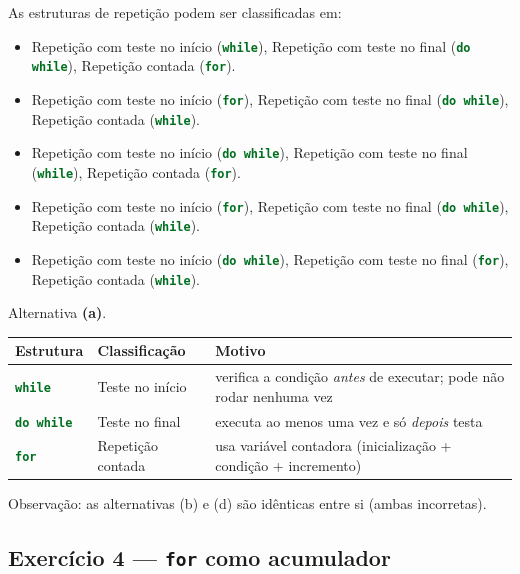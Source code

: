 \documentclass[12pt,a4paper]{article}
\newcommand{\codigo}[1]{\lstinline[language=Java,basicstyle=\ttfamily\small]|#1|}
\begin{document}
\begin{exercicio}
As estruturas de repetição podem ser classificadas em:

\begin{itemize}
  \item[(a)] Repetição com teste no início (\codigo{while}), Repetição com teste
        no final (\codigo{do while}), Repetição contada (\codigo{for}).
  \item[(b)] Repetição com teste no início (\codigo{for}), Repetição com teste
        no final (\codigo{do while}), Repetição contada (\codigo{while}).
  \item[(c)] Repetição com teste no início (\codigo{do while}), Repetição com
        teste no final (\codigo{while}), Repetição contada (\codigo{for}).
  \item[(d)] Repetição com teste no início (\codigo{for}), Repetição com teste
        no final (\codigo{do while}), Repetição contada (\codigo{while}).
  \item[(e)] Repetição com teste no início (\codigo{do while}), Repetição com
        teste no final (\codigo{for}), Repetição contada (\codigo{while}).
\end{itemize}
\end{exercicio}

\begin{resolucao}
Alternativa \textbf{(a)}.

\begin{center}
\begin{tabular}{l l l}
  \hline
  Estrutura & Classificação & Motivo \\
  \hline
  \codigo{while}    & Teste no início   & verifica a condição \emph{antes} de executar; pode não rodar nenhuma vez \\
  \codigo{do while} & Teste no final    & executa ao menos uma vez e só \emph{depois} testa \\
  \codigo{for}      & Repetição contada & usa variável contadora (inicialização + condição + incremento) \\
  \hline
\end{tabular}
\end{center}

Observação: as alternativas (b) e (d) são idênticas entre si (ambas incorretas).
\end{resolucao}

\subsection{Exercício 4 --- \texttt{for} como acumulador}
\end{document}
